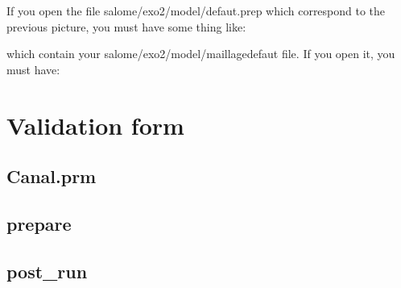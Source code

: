 \documentclass[english]{article}
\begin{document}
If you open the file salome/exo2/model/defaut.prep which correspond to the previous picture, you must have some thing like:


which contain your salome/exo2/model/maillagedefaut file. If you open it, you must have:




\newpage
\section{Validation form}
\subsection{Canal.prm}

\subsection{prepare}

\subsection{post\_run}



\end{document}
